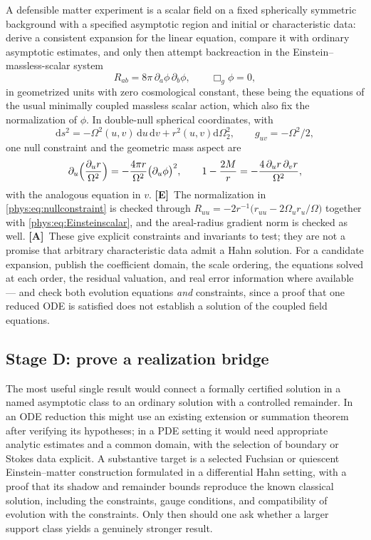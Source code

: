 \documentclass[11pt,letterpaper]{article}
\numberwithin{equation}{section}
\theoremstyle{definition}
\theoremstyle{remark}
\newcommand{\dd}{\mathrm d}
\newcommand{\TE}{\textcolor{TierE}{\textsf{\bfseries[E]}}}
\newcommand{\TA}{\textcolor{TierA}{\textsf{\bfseries[A]}}}
\begin{document}
A defensible matter experiment is a scalar field on a fixed spherically
symmetric background with a specified asymptotic region and initial or
characteristic data: derive a consistent expansion for the linear equation,
compare it with ordinary asymptotic estimates, and only then attempt
backreaction in the Einstein--massless-scalar system
\begin{equation}\label{phys:eq:Einsteinscalar}
R_{ab}=8\pi\,\partial_{a}\phi\,\partial_{b}\phi,
\qquad \Box_{g}\phi=0,
\end{equation}
in geometrized units with zero cosmological constant, these being the equations
of the usual minimally coupled massless scalar action, which also fix the
normalization of $\phi$. In double-null spherical coordinates, with
\begin{equation}\label{phys:eq:doublenull}
\dd s^{2}=-\Omega^{2}(u,v)\,\dd u\,\dd v+r^{2}(u,v)\dd\Omega_{2}^{2},
\qquad g_{uv}=-\Omega^{2}/2,
\end{equation}
one null constraint and the geometric mass aspect are
\begin{equation}\label{phys:eq:nullconstraint}
\partial_{u}\Bigl(\frac{\partial_{u}r}{\Omega^{2}}\Bigr)
=-\frac{4\pi r}{\Omega^{2}}\bigl(\partial_{u}\phi\bigr)^{2},
\qquad
1-\frac{2M}{r}=-\frac{4\,\partial_{u}r\,\partial_{v}r}{\Omega^{2}},
\end{equation}
with the analogous equation in $v$. \TE\ The normalization in
\eqref{phys:eq:nullconstraint} is checked through
$R_{uu}=-2r^{-1}\bigl(r_{uu}-2\Omega_{u}r_{u}/\Omega\bigr)$ together with
\eqref{phys:eq:Einsteinscalar}, and the areal-radius gradient norm is checked
as well. \TA\ These give explicit constraints and invariants to test; they are
not a promise that arbitrary characteristic data admit a Hahn solution. For a
candidate expansion, publish the coefficient domain, the scale ordering, the
equations solved at each order, the residual valuation, and real error
information where available --- and check both evolution equations \emph{and}
constraints, since a proof that one reduced ODE is satisfied does not establish
a solution of the coupled field equations.

\subsection{Stage D: prove a realization bridge}
\label{phys:sub:stageD}

The most useful single result would connect a formally certified solution in a
named asymptotic class to an ordinary solution with a controlled remainder. In
an ODE reduction this might use an existing extension or summation theorem
after verifying its hypotheses; in a PDE setting it would need appropriate
analytic estimates and a common domain, with the selection of boundary or
Stokes data explicit. A substantive target is a selected Fuchsian or quiescent
Einstein--matter construction formulated in a differential Hahn setting, with a
proof that its shadow and remainder bounds reproduce the known classical
solution, including the constraints, gauge conditions, and compatibility of
evolution with the constraints. Only then should one ask whether a larger
support class yields a genuinely stronger result.
\end{document}
